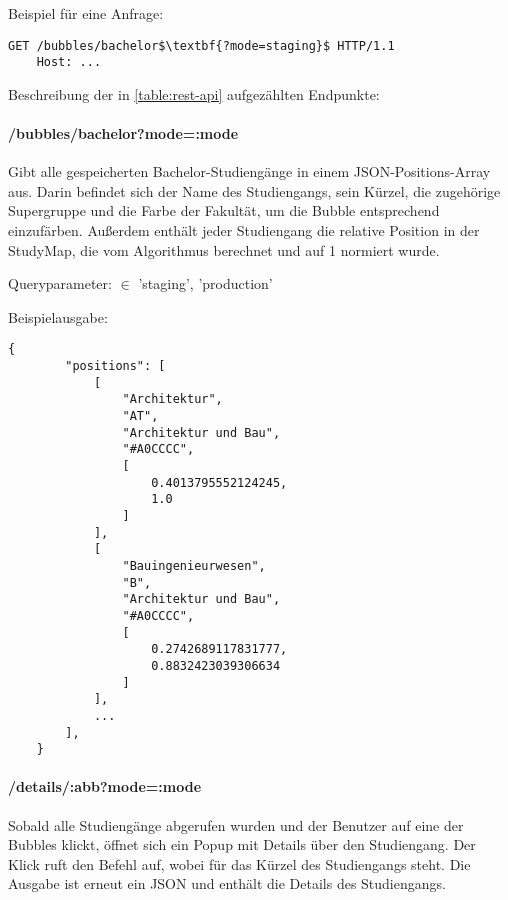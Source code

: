 \noindent
Beispiel für eine Anfrage:
\begin{lstlisting}[style=Python, mathescape=true]
    GET /bubbles/bachelor$\textbf{?mode=staging}$ HTTP/1.1
    Host: ...
\end{lstlisting}


\noindent
Beschreibung der in \autoref{table:rest-api} aufgezählten Endpunkte:

\paragraph*{/bubbles/bachelor?mode=:mode}
\vspace{-1.0em}
Gibt alle gespeicherten Bachelor-Studiengänge in einem JSON-Positions-Array aus. Darin befindet sich der Name des Studiengangs, sein Kürzel, die zugehörige Supergruppe und die Farbe der Fakultät, um die Bubble entsprechend einzufärben. Außerdem enthält jeder Studiengang die relative Position in der StudyMap, die vom Algorithmus berechnet und auf 1 normiert wurde.

\noindent
Queryparameter:  $\in$ {'staging', 'production'}

\noindent
Beispielausgabe:

\begin{lstlisting}[style=Python]
    {
        "positions": [
            [
                "Architektur",
                "AT",
                "Architektur und Bau",
                "#A0CCCC",
                [
                    0.4013795552124245,
                    1.0
                ]
            ],
            [
                "Bauingenieurwesen",
                "B",
                "Architektur und Bau",
                "#A0CCCC",
                [
                    0.2742689117831777,
                    0.8832423039306634
                ]
            ],
            ...
        ],
    }
\end{lstlisting}

\paragraph*{/details/:abb?mode=:mode}
\vspace{-1.0em}
Sobald alle Studiengänge abgerufen wurden und der Benutzer auf eine der Bubbles klickt, öffnet sich ein Popup mit Details über den Studiengang. Der Klick ruft den Befehl  auf, wobei  für das Kürzel des Studiengangs steht. Die Ausgabe ist erneut ein JSON und enthält die Details des Studiengangs.

